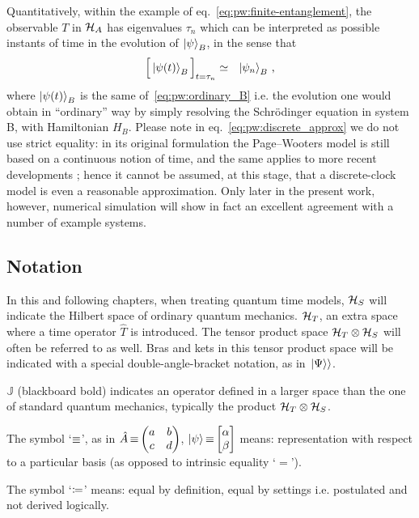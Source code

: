 Quantitatively, within the example of eq.~\eqref{eq:pw:finite-entanglement},
the observable $T$ in $\mathcal{H}_A$
has eigenvalues $\tau_n$ which can be interpreted as possible
instants of time in the evolution of $\ket{\psi}_B$, in the sense that
\begin{equation}\label{eq:pw:discrete_approx}
  \Big[ \ket{\psi(t)}_B \Big]_{t=\tau_n} \simeq \,\,\,\, \ket{\psi_n}_B \, \text{,}
\end{equation}
where $\ket{\psi(t)}_B$ is the same of~\eqref{eq:pw:ordinary_B} i.e.
the evolution one would obtain in ``ordinary'' way
by simply resolving the Schr\"{o}dinger equation in system B, with Hamiltonian $H_B$.
Please note in eq.~\eqref{eq:pw:discrete_approx} we do not use strict equality:
in its original formulation the Page--Wooters model is still based on a continuous
notion of time, and the same applies to more recent developments \parencite{Lloyd:Time}; hence
it cannot be assumed, at this stage, that a discrete-clock model
is even a reasonable approximation.
Only later in the present work, however, numerical
simulation will show in fact an excellent agreement with a number of example systems.

\subsection*{Notation}

In this and following chapters, when treating quantum time models,
$\mathcal{H}_S$ will indicate the Hilbert space of ordinary quantum mechanics.
$\mathcal{H}_T$, an extra space where a time operator $\hat{T}$ is introduced. The tensor
product space $\mathcal{H}_T \otimes \mathcal{H}_S$
will often be referred to as well.
Bras and kets in this tensor product space will be indicated with a special double-angle-bracket
notation, as in $\left.\left| \Psi \right\rangle\right\rangle$.

${\mathbb{J}}$ (blackboard bold) indicates an  operator defined in
a larger space than the one of standard quantum mechanics,
typically the product $\mathcal{H}_T \otimes \mathcal{H}_S$.

The symbol `$\operatorname*{\equiv}$', as in $\hat{A} \repr \mqty(a&b\\c&d)$, $\ket{\psi} \repr \mqty[\alpha \\ \beta]$
means: representation with respect to a particular basis (as opposed to intrinsic equality `$=$').

The symbol `$\coloneqq$'
means: equal by definition, equal by settings i.e. postulated and not derived logically.
